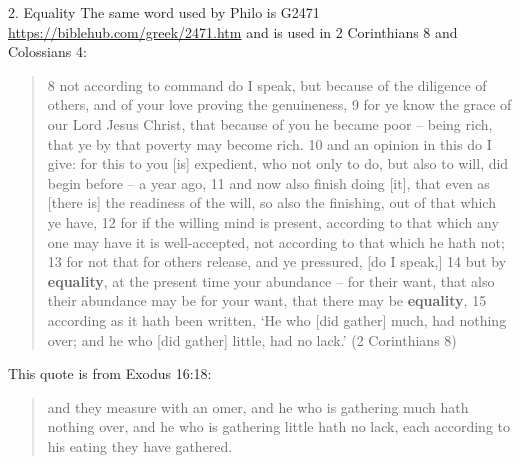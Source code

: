 \documentclass[11pt]{article}
\begin{document}
2. Equality \newline
The same word used by Philo is G2471 \url{https://biblehub.com/greek/2471.htm} and is used in 2 Corinthians 8 and Colossians 4:
\begin{quote}
8 not according to command do I speak, but because of the diligence of others, and of your love proving the genuineness, 9 for ye know the grace of our Lord Jesus Christ, that because of you he became poor -- being rich, that ye by that poverty may become rich. 10 and an opinion in this do I give: for this to you [is] expedient, who not only to do, but also to will, did begin before -- a year ago, 11 and now also finish doing [it], that even as [there is] the readiness of the will, so also the finishing, out of that which ye have, 12 for if the willing mind is present, according to that which any one may have it is well-accepted, not according to that which he hath not; 13 for not that for others release, and ye pressured, [do I speak,] 14 but by \textbf{equality}, at the present time your abundance -- for their want, that also their abundance may be for your want, that there may be \textbf{equality}, 15 according as it hath been written, `He who [did gather] much, had nothing over; and he who [did gather] little, had no lack.'
(2 Corinthians 8)
\end{quote}

This quote is from Exodus 16:18:
\begin{quote}
and they measure with an omer, and he who is gathering much hath nothing over, and he who is gathering little hath no lack, each according to his eating they have gathered.
\end{quote}
\end{document}
